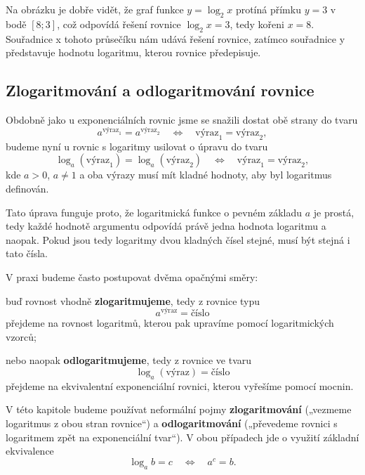 \documentclass[12pt,a4paper]{article}
\begin{document}
Na obrázku je dobře vidět, že graf funkce $y = \log_2 x$ protíná přímku $y = 3$ v bodě
$[8;3]$, což odpovídá řešení rovnice $\log_2 x = 3$, tedy kořeni $x = 8$. Souřadnice
x tohoto průsečíku nám udává řešení rovnice, zatímco souřadnice y představuje hodnotu
logaritmu, kterou rovnice předepisuje.

\subsection*{Zlogaritmování a odlogaritmování rovnice}

Obdobně jako u exponenciálních rovnic jsme se snažili dostat obě strany do tvaru
\[
a^{\text{výraz}_1} = a^{\text{výraz}_2}
\quad\Longleftrightarrow\quad
\text{výraz}_1 = \text{výraz}_2,
\]
budeme nyní u rovnic s logaritmy usilovat o úpravu do tvaru
\[
\log_a(\text{výraz}_1) = \log_a(\text{výraz}_2)
\quad\Longleftrightarrow\quad
\text{výraz}_1 = \text{výraz}_2,
\]
kde $a>0$, $a\neq 1$ a oba výrazy musí mít kladné hodnoty, aby byl logaritmus definován.

Tato úprava funguje proto, že logaritmická funkce o pevném základu $a$ je prostá,
tedy každé hodnotě argumentu odpovídá právě jedna hodnota logaritmu a naopak.
Pokud jsou tedy logaritmy dvou kladných čísel stejné, musí být stejná i tato čísla.

V praxi budeme často postupovat dvěma opačnými směry:

buď rovnost vhodně \textbf{zlogaritmujeme}, tedy z rovnice typu
  \[
  a^{\text{výraz}} = \text{číslo}
  \]
  přejdeme na rovnost logaritmů, kterou pak upravíme pomocí logaritmických vzorců;

nebo naopak \textbf{odlogaritmujeme}, tedy z rovnice ve tvaru
  \[
  \log_a(\text{výraz}) = \text{číslo}
  \]
  přejdeme na ekvivalentní exponenciální rovnici, kterou vyřešíme pomocí mocnin.

\begin{notebox}
V této kapitole budeme používat neformální pojmy \textbf{zlogaritmování}
(„vezmeme logaritmus z obou stran rovnice“) a \textbf{odlogaritmování} („převedeme
rovnici s logaritmem zpět na exponenciální tvar“). V obou případech jde o využití
základní ekvivalence
\[
\log_a b = c \quad\Longleftrightarrow\quad a^c = b.
\]
\end{notebox}
\end{document}
